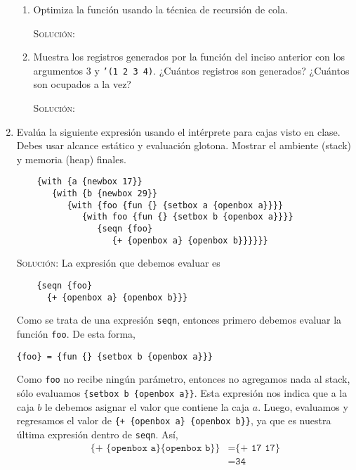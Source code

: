 \documentclass[letterpaper,11pt]{article}
\begin{document}
\begin{enumerate}
\begin{enumerate}
        \item Optimiza la función usando la técnica de recursión de cola.
        
        \textsc{Solución:}

        \item Muestra los registros generados por la función del inciso anterior
        con los argumentos $3$ y \texttt{'(1 2 3 4)}. ¿Cuántos registros son 
        generados? ¿Cuántos son ocupados a la vez?

        \textsc{Solución:}
    \end{enumerate}

    \item Evalúa la siguiente expresión usando el intérprete para cajas visto 
    en clase. Debes usar alcance estático y evaluación glotona. Mostrar el 
    ambiente (stack) y memoria (heap) finales.
    \begin{verbatim}
    {with {a {newbox 17}}
       {with {b {newbox 29}}
          {with {foo {fun {} {setbox a {openbox a}}}}
             {with foo {fun {} {setbox b {openbox a}}}}
                {seqn {foo}
                   {+ {openbox a} {openbox b}}}}}}
    \end{verbatim}

    \textsc{Solución:} La expresión que debemos evaluar es 
    \begin{verbatim}
    {seqn {foo}
      {+ {openbox a} {openbox b}}}
    \end{verbatim}

    Como se trata de una expresión \texttt{seqn}, entonces primero debemos 
    evaluar la función \texttt{foo}. De esta forma, 
    \begin{center}
        \texttt{\{foo\} = \{fun \{\} \{setbox b \{openbox a\}\}\}}
    \end{center}

    Como \texttt{foo} no recibe ningún parámetro, entonces no agregamos nada 
    al stack, sólo evaluamos \texttt{\{setbox b \{openbox a\}\}}. Esta 
    expresión nos indica que a la caja $b$ le debemos asignar el valor que 
    contiene la caja $a$. Luego, evaluamos y regresamos el valor de 
    \texttt{\{+ \{openbox a\} \{openbox b\}\}}, ya que es nuestra última 
    expresión dentro de \texttt{seqn}. Así, 
    \begin{align*}
        \texttt{\{+ \{openbox a\} \{openbox b\}\}}
        &= \texttt{\{+ 17 17\}} \\
        &= \texttt{34}
    \end{align*}


\end{enumerate}
\end{document}
